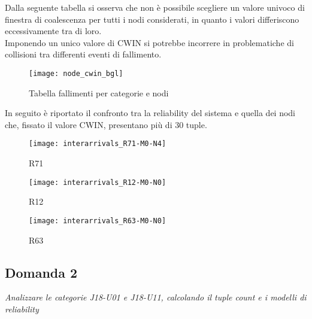 \clearpage

Dalla seguente tabella si osserva che non è possibile scegliere un
valore univoco di finestra di coalescenza per tutti i nodi considerati, in quanto
i valori differiscono eccessivamente tra di loro.\\
Imponendo un unico valore di CWIN si potrebbe incorrere in problematiche di
collisioni tra differenti eventi di fallimento.\\

\begin{figure}[!htbp]
  \centering
  \texttt{[image: node\_cwin\_bgl]}
  \caption{Tabella fallimenti per categorie e nodi}
  \label{node_cwin_bgl}
\end{figure}

\clearpage

In seguito è riportato il confronto tra la reliability del sistema e quella dei
nodi che, fissato il valore CWIN, presentano più di 30 tuple.\\

\begin{minipage}{\linewidth}
  \centering
  \begin{minipage}{.49\linewidth}
    \begin{figure}[H]
      \texttt{[image: interarrivals\_R71-M0-N4]}
      \caption*{R71}
    \end{figure}
  \end{minipage}
  \begin{minipage}{.49\linewidth}
    \begin{figure}[H]
      \texttt{[image: interarrivals\_R12-M0-N0]}
      \caption*{R12}
    \end{figure}
  \end{minipage}
  \begin{minipage}{.49\linewidth}
    \hspace{0.25\linewidth}
    \begin{figure}[H]
      \texttt{[image: interarrivals\_R63-M0-N0]}
      \caption*{R63}
    \end{figure}
  \end{minipage}
\end{minipage}

\clearpage

\subsection{Domanda 2}
\textit{Analizzare le categorie J18-U01 e J18-U11, calcolando il tuple count e
i modelli di reliability}

